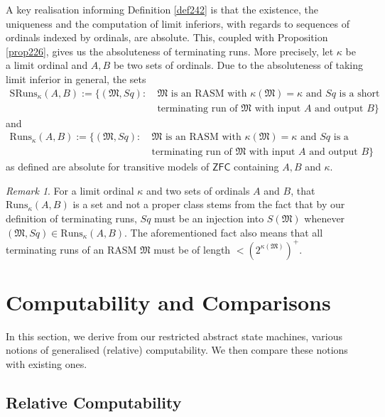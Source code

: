 \documentclass[12pt, twoside]{memoir}
\numberwithin{equation}{section}
\theoremstyle{definition}
\theoremstyle{remark}
\newtheorem{rem}[thm]{Remark}
\theoremstyle{definition}
\theoremstyle{definition}
\theoremstyle{definition}
\theoremstyle{remark}
\begin{document}
A key realisation informing Definition \ref{def242} is that the existence, the uniqueness and the computation of limit inferiors, with regards to sequences of ordinals indexed by ordinals, are absolute. This, coupled with Proposition \ref{prop226}, gives us the absoluteness of terminating runs. More precisely, let $\kappa$ be a limit ordinal and $A, B$ be two sets of ordinals. Due to the absoluteness of taking limit inferior in general, the sets
\begin{align*}
    \mathrm{SRuns}_{\kappa}(A, B) := \{(\mathfrak{M}, Sq) : \ & \mathfrak{M} \text{ is an RASM with } \kappa(\mathfrak{M}) = \kappa \text{ and } Sq \text{ is a short} \\
    & \text{terminating run of } \mathfrak{M} \text{ with input } A \text{ and output } B\}
\end{align*}
and
\begin{align*}
    \mathrm{Runs}_{\kappa}(A, B) := \{(\mathfrak{M}, Sq) : \ & \mathfrak{M} \text{ is an RASM with } \kappa(\mathfrak{M}) = \kappa \text{ and } Sq \text{ is a} \\
    & \text{terminating run of } \mathfrak{M} \text{ with input } A \text{ and output } B\}
\end{align*}
as defined are absolute for transitive models of $\mathsf{ZFC}$ containing $A, B$ and $\kappa$. 

\begin{rem}\label{rem243}
For a limit ordinal $\kappa$ and two sets of ordinals $A$ and $B$, that $\mathrm{Runs}_{\kappa}(A, B)$ is a set and not a proper class stems from the fact that by our definition of terminating runs, $Sq$ must be an injection into $S(\mathfrak{M})$ whenever $(\mathfrak{M}, Sq) \in \mathrm{Runs}_{\kappa}(A, B)$. The aforementioned fact also means that all terminating runs of an RASM $\mathfrak{M}$ must be of length $< (2^{\kappa(\mathfrak{M})})^+$.
\end{rem}

\section{Computability and Comparisons}

In this section, we derive from our restricted abstract state machines, various notions of generalised (relative) computability. We then compare these notions with existing ones.

\subsection{Relative Computability}
\end{document}
